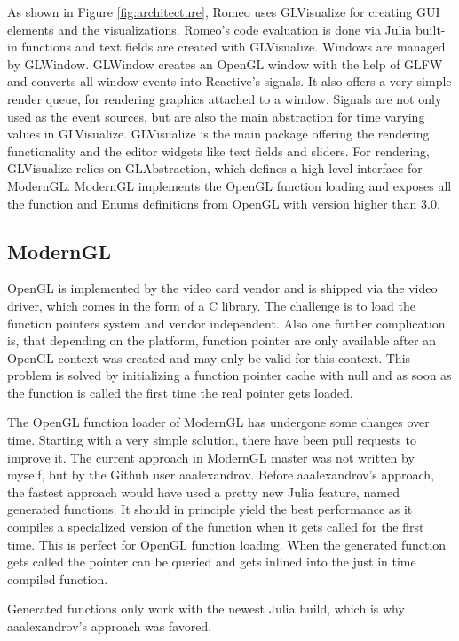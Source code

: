 As shown in Figure \ref{fig:architecture}, Romeo uses GLVisualize for creating \ac{GUI} elements and the visualizations. Romeo's code evaluation is done via Julia built-in functions and text fields are created with GLVisualize.
Windows are managed by GLWindow. 
GLWindow creates an OpenGL window with the help of GLFW and converts all window events into Reactive's signals. 
It also offers a very simple render queue, for rendering graphics attached to a window.
Signals are not only used as the event sources, but are also the main abstraction for time varying values in GLVisualize.
GLVisualize is the main package offering the rendering functionality and the editor widgets like text fields and sliders.
For rendering, GLVisualize relies on GLAbstraction, which defines a high-level interface for ModernGL.
ModernGL implements the \ac{OpenGL} function loading and exposes all the function and Enums definitions from \ac{OpenGL} with version higher than 3.0.



\subsection{ModernGL}
\ac{OpenGL} is implemented by the video card vendor and is shipped via the video driver, which comes in the form of a C library.
The challenge is to load the function pointers system and vendor independent. 
Also one further complication is, that depending on the platform, function pointer are only available after an \ac{OpenGL} context was created and may only be valid for this context. \cite{wgl}
This problem is solved by initializing a function pointer cache with null and as soon as the function is called the first time the real pointer gets loaded.

The OpenGL function loader of ModernGL has undergone some changes over time.
Starting with a very simple solution, there have been pull requests to improve it.
The current approach in ModernGL master was not written by myself, but by the Github user aaalexandrov\cite{Aaalexandrov}.
Before aaalexandrov’s approach, the fastest approach would have used a pretty new Julia feature, named generated functions.
It should in principle yield the best performance as it compiles a specialized version of the function when it gets called for the first time. This is perfect for \ac{OpenGL} function loading. When the generated function gets called the pointer can be queried and gets inlined into the just in time compiled function.

Generated functions only work with the newest Julia build, which is why aaalexandrov’s approach was favored.


